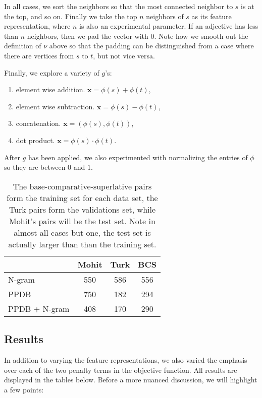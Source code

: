 In all cases, we sort the neighbors so that the most connected neighbor to $s$ is at the top, and so on. Finally we take the top $n$ neighbors of $s$ as its feature representation, where $n$ is also an experimental parameter. If an adjective has less than $n$ neighbors, then we pad the vector with $0$. Note how we smooth out the definition of $\nu$ above so that the padding can be distinguished from a case where there are vertices from $s$ to $t$, but not vice versa.




Finally, we explore a variety of $g$'s:

\begin{enumerate}
	\item element wise addition. $\pmb{x} = \phi(s) + \phi(t)$,
	\item element wise subtraction. $\pmb{x} = \phi(s) - \phi(t)$,
	\item concatenation. $\pmb{x} = (\phi(s), \phi(t))$,
	\item dot product. $\pmb{x} = \phi(s) \cdot \phi(t)$.
\end{enumerate}

After $g$ has been applied, we also experimented with normalizing the entries of $\phi$ so they are between $0$ and $1$. 


\begin{table}
\small
\centering
\begin{tabular}{|l|c|c|c|}
	\hline 
	& \multicolumn{1}{c|}{Mohit} 
	& \multicolumn{1}{c|}{Turk} 
	& \multicolumn{1}{c|}{BCS} \\
	\hline 
	N-gram          & 550 & 586 & 556 \\
	PPDB            & 750 & 182 & 294 \\
	PPDB + N-gram   & 408 & 170 & 290 \\
	\hline
\end{tabular}
\caption{\label{font-table} The base-comparative-superlative pairs form the training set for each data set, the Turk pairs form the validations set, while Mohit's pairs will be the test set. Note in almost all cases but one, the test set is actually larger than than the training set. }
\end{table}


\subsection{Results}

In addition to varying the feature representations, we also varied the emphasis over each of the two penalty terms in the objective function. All results are displayed in the tables below. Before a more nuanced discussion, we will highlight a few points:

